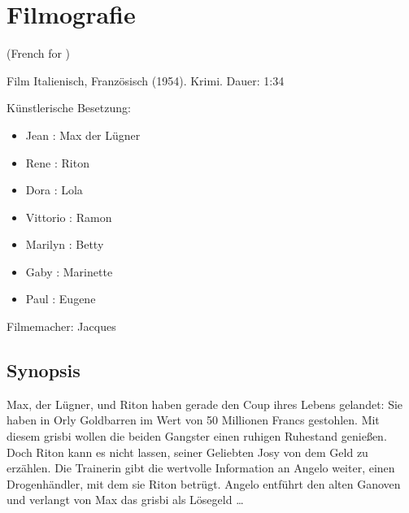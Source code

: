 \section{Filmografie\label{preamble-filmography}}

 (French for )

Film Italienisch, Französisch (1954). Krimi. Dauer: 1:34

Künstlerische Besetzung:

\begin{itemize}
    \item Jean : Max der Lügner
    \item Rene : Riton
    \item Dora : Lola
    \item Vittorio : Ramon
    \item Marilyn : Betty
    \item Gaby : Marinette
    \item Paul : Eugene
\end{itemize}

Filmemacher: Jacques 

\subsection*{Synopsis}


Max, der Lügner, und Riton haben gerade den Coup ihres Lebens gelandet: Sie haben in Orly Goldbarren im Wert von 50 Millionen Francs gestohlen. Mit diesem \glqq{}grisbi\grqq{} wollen die beiden Gangster einen ruhigen Ruhestand genießen. Doch Riton kann es nicht lassen, seiner Geliebten Josy von dem Geld zu erzählen. Die Trainerin gibt die wertvolle Information an Angelo weiter, einen Drogenhändler, mit dem sie Riton betrügt. Angelo entführt den alten Ganoven und verlangt von Max das \glqq{}grisbi\grqq{} als Lösegeld \dots{}


